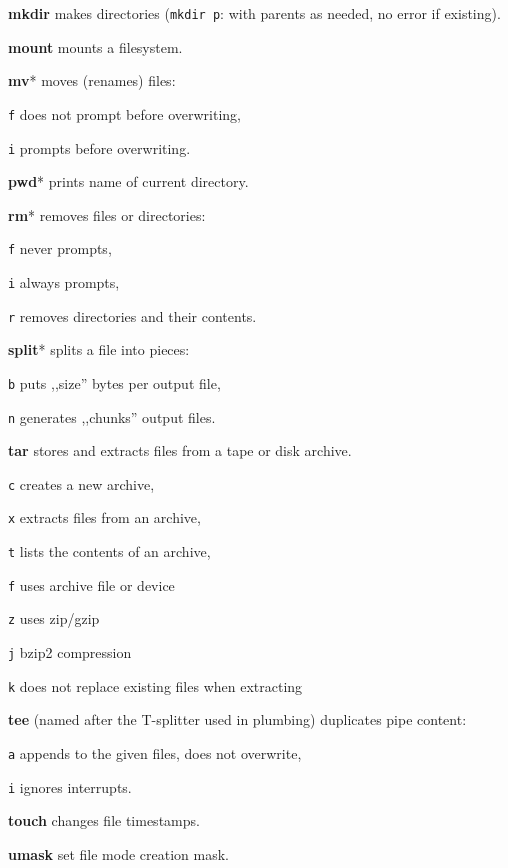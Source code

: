 \manualbreak

\textbf{mkdir} makes directories (\texttt{mkdir p}: with parents as needed, no
error if existing).

\textbf{mount} mounts a filesystem.

\textbf{mv}* moves (renames) files:
\begin{enumx}
	\item [\texttt{f}] does not prompt before overwriting,
	\item [\texttt{i}] prompts before overwriting.
\end{enumx}

\textbf{pwd}* prints name of current directory.

\textbf{rm}* removes files or directories:
\begin{enumx}
	\item [\texttt{f}] never prompts,
	\item [\texttt{i}] always prompts,
	\item [\texttt{r}] removes directories and their contents.
\end{enumx}


\textbf{split}* splits a file into pieces:
\begin{enumx}
	\item [\texttt{b}] puts ,,size'' bytes per output file,
	\item [\texttt{n}] generates ,,chunks'' output files.
\end{enumx}

\textbf{tar} stores and extracts files from a tape or disk archive.
\begin{enumx}
	\item [\texttt{c}] creates a new archive,
	\item [\texttt{x}] extracts files from an archive,
	\item [\texttt{t}] lists the contents of an archive,
	\item [\texttt{f}] uses archive file or device
	\item [\texttt{z}] uses zip/gzip
	\item [\texttt{j}] bzip2 compression
	\item [\texttt{k}] does not replace existing files when extracting
\end{enumx}

\textbf{tee} (named after the T-splitter used in plumbing) duplicates pipe content:
\begin{enumx}
	\item [\texttt{a}] appends to the given files, does not overwrite,
	\item [\texttt{i}] ignores interrupts.
\end{enumx}

\textbf{touch} changes file timestamps.


\textbf{umask} set file mode creation mask.
 
